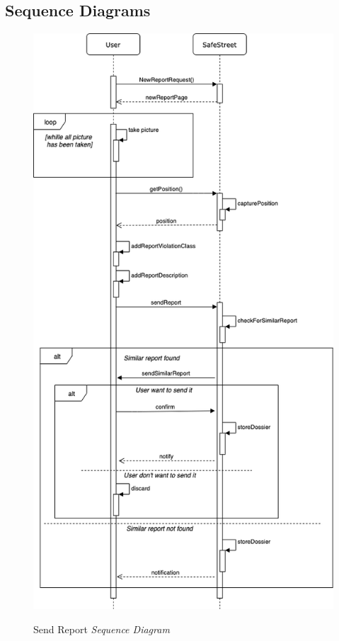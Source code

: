 \documentclass[../RASD.tex]{subfiles}
\begin{document}
            \subsection{Sequence Diagrams}\label{subsec:sequence-diagrams}
                \begin{figure}[H]
                    \centering
                    \includegraphics[scale = 2]{assets/sendReportSD.png}\\[1.6 cm]
                    \caption[Send Report \textit{Sequence Diagram}]{Send Report \textit{Sequence Diagram}}
                \end{figure}
\end{document}
